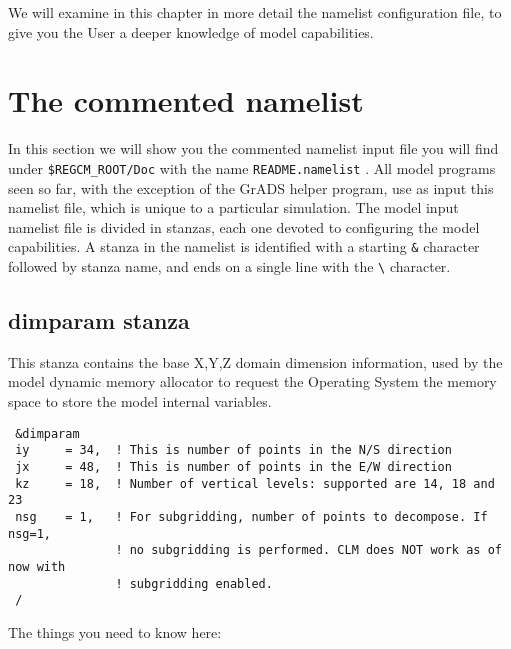 %
%

We will examine in this chapter in more detail the namelist configuration file,
to give you the User a deeper knowledge of model capabilities.

\section{The commented namelist}

In this section we will show you the commented namelist input file you will
find under \verb=$REGCM_ROOT/Doc= with the name \verb=README.namelist= .
All model programs seen so far, with the exception of the GrADS helper program,
use as input this namelist file, which is unique to a particular simulation.
The model input namelist file is divided in stanzas, each one devoted to
configuring the model capabilities.
A stanza in the namelist is identified with a starting \verb=&= character
followed by stanza name, and ends on a single line with the \verb=\=
character.

\subsection{dimparam stanza}
\label{dimparam}

This stanza contains the base X,Y,Z domain dimension information, used
by the model dynamic memory allocator to request the Operating System the
memory space to store the model internal variables.

{\footnotesize
\begin{Verbatim}
 &dimparam
 iy     = 34,  ! This is number of points in the N/S direction
 jx     = 48,  ! This is number of points in the E/W direction
 kz     = 18,  ! Number of vertical levels: supported are 14, 18 and 23
 nsg    = 1,   ! For subgridding, number of points to decompose. If nsg=1,
               ! no subgridding is performed. CLM does NOT work as of now with
               ! subgridding enabled.
 /
\end{Verbatim}
}

The things you need to know here:

